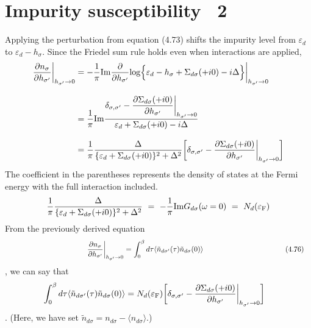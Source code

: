 \documentclass[a4j]{jarticle}
\begin{document}
\section*{Impurity susceptibility \ 2}

Applying the perturbation from equation (4.73) shifts the impurity level from $\varepsilon_{d}$ to $\varepsilon_{d} - h_{\sigma}$.
Since the Friedel sum rule holds even when interactions are applied,
\begin{align}
	\frac{\partial n_{\sigma}}{\partial h_{\sigma'}}
	\bigg|_{h_{\sigma'} \to 0}
	 & =
	- \frac{1}{\pi}
	{\rm Im}
	\frac{\partial }{\partial h_{\sigma'}}
	{\rm log}
	\Big\{
	\varepsilon_{d}
	-
	h_{\sigma}
	+
	\Sigma_{d\sigma}(+i 0)
	-
	i \Delta
	\Big\}
	\bigg|_{h_{\sigma'} \to 0}
	\nonumber \\[3mm] &=
	\frac{1}{\pi}
	{\rm Im}
	\frac{
		\delta_{\sigma,\sigma'}
		-
		\dfrac{\partial \Sigma_{d \sigma}(+i0)}{\partial h_{\sigma'}}
		\bigg|_{h_{\sigma'} \to 0}
	}
	{
		\varepsilon_{d}
		+
		\Sigma_{d\sigma}(+i 0)
		-
		i \Delta
	}
	\nonumber \\[3mm] &=
	\frac{1}{\pi}
	\frac{
		\Delta
	}
	{
		\{
		\varepsilon_{d}
		+
		\Sigma_{d\sigma}(+i 0)
		\}^{2}
		+
		\Delta^{2}
	}
	\bigg[
		\delta_{\sigma,\sigma'}
		-
		\dfrac{\partial \Sigma_{d \sigma}(+i0)}{\partial h_{\sigma'}}
		\bigg|_{h_{\sigma'} \to 0}
		\bigg]
\end{align}
The coefficient in the parentheses represents the density of states at the Fermi energy with the full interaction included.
\begin{align}
	\frac{1}{\pi}
	\frac{
		\Delta
	}
	{
		\{
		\varepsilon_{d}
		+
		\Sigma_{d\sigma}(+i 0)
		\}^{2}
		+
		\Delta^{2}
	}
	\ = \
	-
	\frac{1}{\pi}
	{\rm Im}G_{d \sigma}(\omega=0)
	\ = \
	N_{d}(\varepsilon_{\rm F})
\end{align}
From the previously derived equation
\begin{align}
	\hspace{39.4mm}
	\frac{
		\partial
		n_{\sigma}
	}{
		\partial
		h_{\sigma'}
	}
	\bigg|_{h_{\sigma'} \to 0}
	 & =
	\int^{\beta}_{0}d \tau
	\langle
	\tilde{n}_{d \sigma'}(\tau)
	\tilde{n}_{d \sigma}(0)
	\rangle
	\nonumber
	\hspace{39.4mm}
	(4.76)
\end{align}
, we can say that
\begin{align}
	\int^{\beta}_{0}d \tau
	\langle
	\tilde{n}_{d \sigma'}(\tau)
	\tilde{n}_{d \sigma}(0)
	\rangle
	 & =
	N_{d}(\varepsilon_{\rm F})
	\bigg[
		\delta_{\sigma,\sigma'}
		-
		\dfrac{\partial \Sigma_{d \sigma}(+i0)}{\partial h_{\sigma'}}
		\bigg|_{h_{\sigma'} \to 0}
		\bigg]
\end{align}
.
(Here, we have set $ \tilde{n}_{d \sigma} = n_{d \sigma} - \langle n_{d \sigma} \rangle $.)
\end{document}
